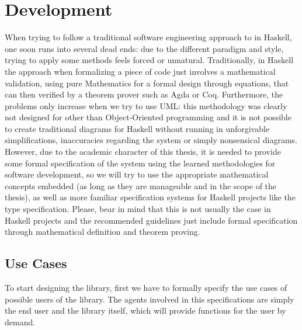 \section{Development}

When trying to follow a traditional software engineering approach to in
Haskell, one soon runs into several dead ends: due to the different paradigm
and style, trying to apply some methods feels forced or unnatural.
Traditionally, in Haskell the approach when formalizing a piece of code just
involves a mathematical validation, using pure Mathematics for a formal design
through equations, that can then verified by a theorem prover such as Agda or
Coq. Furthermore, the problems only increase when we try to use UML: this
methodology was clearly not designed for other than Object-Oriented programming
and it is not possible to create traditional diagrams for Haskell without
running in unforgivable simplifications, inaccuracies regarding the system or
simply nonsensical diagrams. \\

However, due to the academic character of this thesis, it is needed to provide
some formal specification of the system using the learned methodologies for
software development, so we will try to use the appropriate mathematical
concepts embedded (as long as they are manageable and in the scope of the
thesis), as well as more familiar specification systems for Haskell projects
like the type specification. Please, bear in mind that this is not usually the
case in Haskell projects and the recommended guidelines just include formal
specification through mathematical definition and theorem proving. \\

\subsection{Use Cases}

To start designing the library, first we have to formally specify the use cases
of possible users of the library. The agents involved in this specifications
are simply the end user and the library itself, which will provide functions
for the user by demand.\\

